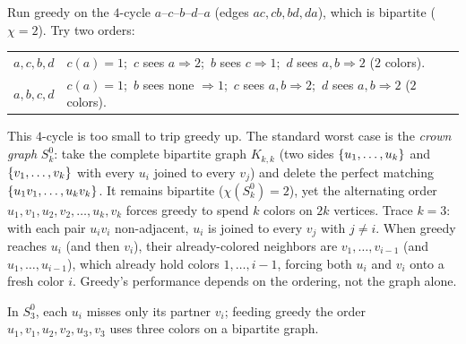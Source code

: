 \begin{labbox}
Run greedy on the $4$-cycle $a$--$c$--$b$--$d$--$a$ (edges $ac,cb,bd,da$), which is
bipartite ($\chi=2$). Try two orders:
\begin{center}
\small
\begin{tabular}{ll}
\toprule
$a,c,b,d$ & $c(a)=1$;\ $c$ sees $a\Rightarrow 2$;\ $b$ sees $c\Rightarrow 1$;\ $d$ sees $a,b\Rightarrow 2$ ($2$ colors).\\
$a,b,c,d$ & $c(a)=1$;\ $b$ sees none $\Rightarrow 1$;\ $c$ sees $a,b\Rightarrow 2$;\ $d$ sees $a,b\Rightarrow 2$ ($2$ colors).\\
\bottomrule
\end{tabular}
\end{center}
This $4$-cycle is too small to trip greedy up. The standard worst case is the
\emph{crown graph} $S_k^0$: take the complete bipartite graph $K_{k,k}$ (two sides $\{u_1,\dots,u_k\}$ and $\{v_1,\dots,v_k\}$ with every $u_i$ joined to every $v_j$) and delete the perfect matching $\{u_1v_1,\dots,u_kv_k\}$. It remains bipartite
($\chi(S_k^0)=2$), yet the alternating order $u_1,v_1,u_2,v_2,\dots,u_k,v_k$ forces greedy to spend
$k$ colors on $2k$ vertices. Trace $k=3$: with each pair $u_iv_i$ non-adjacent, $u_i$ is joined to every $v_j$ with $j\neq i$. When greedy reaches $u_i$ (and then $v_i$), their already-colored neighbors are $v_1,\dots,v_{i-1}$
(and $u_1,\dots,u_{i-1}$), which already hold colors $1,\dots,i-1$, forcing both $u_i$ and $v_i$ onto a fresh color $i$. Greedy's performance depends on the ordering, not the graph alone.
\begin{center}
\end{center}
In $S_3^0$, each $u_i$ misses only its partner $v_i$; feeding greedy the order
$u_1,v_1,u_2,v_2,u_3,v_3$ uses three colors on a bipartite graph.
\end{labbox}

